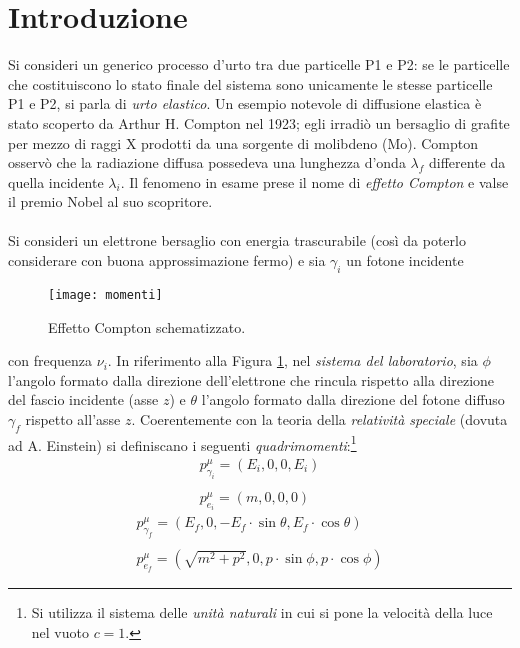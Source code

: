 \documentclass[a4paper, 12pt, oneside]{article}
\author{Bramati F., Brusa R., Viscardi L.}
\begin{document}
			
\section{Introduzione}
Si consideri un generico processo d'urto tra due particelle P1 e P2: se le particelle che costituiscono lo stato finale del sistema sono unicamente le stesse particelle P1 e P2, si parla di \emph{urto elastico}. Un esempio notevole di diffusione elastica è stato scoperto da Arthur H. Compton nel 1923; egli irradiò un bersaglio di grafite per mezzo di raggi X prodotti da una sorgente di molibdeno (Mo). Compton osservò che la radiazione diffusa possedeva una lunghezza d'onda $\lambda_f$ differente da quella incidente $\lambda_i$. Il fenomeno in esame prese il nome di \emph{effetto Compton} e valse il premio Nobel al suo scopritore.\\\\
Si consideri un elettrone bersaglio con energia trascurabile (così da poterlo considerare con buona approssimazione fermo) e sia $\gamma_i$ un fotone incidente
\begin{figure}[!h]
	\centering
	\texttt{[image: momenti]}
	\caption{Effetto Compton schematizzato.} \label{c1}
\end{figure}
con frequenza $\nu_i$. In riferimento alla Figura \ref{c1}, nel \emph{sistema del laboratorio}, sia $\phi$ l'angolo formato dalla direzione dell'elettrone che rincula rispetto alla direzione del fascio incidente (asse $z$) e $\theta$ l'angolo formato dalla direzione del fotone diffuso $\gamma_f$ rispetto all'asse $z$. Coerentemente con la teoria della \emph{relatività speciale} (dovuta ad A. Einstein) si definiscano i seguenti \emph{quadrimomenti}:\footnote{Si utilizza il sistema delle \emph{unità naturali} in cui si pone la velocità della luce nel vuoto $c=1$.}
\begin{displaymath}
\begin{array}{l}
p_{\gamma_i}^\mu = \left(E_i,0,0,E_i \right)\\\\
p_{e_i}^\mu=(m,0,0,0)
\end{array}
\end{displaymath}
\begin{displaymath}
\begin{array}{l}
p_{\gamma_f}^\mu=\left(E_f,0,-E_f\cdot\sin\theta,E_f\cdot\cos\theta\right)\\\\
p_{e_f}^\mu=\left(\sqrt{m^2+p^2},0,p\cdot\sin\phi,p\cdot\cos\phi\right)
\end{array}
\end{displaymath}
\end{document}
